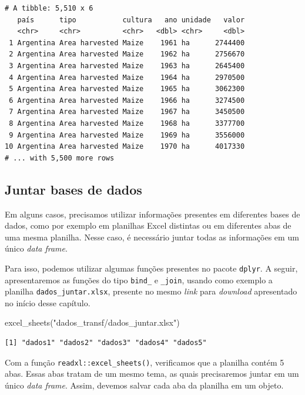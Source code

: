 \documentclass[
  brazilian,
]{book}
\newenvironment{Shaded}{\begin{snugshade}}{\end{snugshade}}
\newcommand{\FunctionTok}[1]{\textcolor[rgb]{0.00,0.00,0.00}{#1}}
\newcommand{\NormalTok}[1]{#1}
\newcommand{\StringTok}[1]{\textcolor[rgb]{0.31,0.60,0.02}{#1}}
\begin{document}
\begin{verbatim}
# A tibble: 5,510 x 6
   país      tipo           cultura   ano unidade   valor
   <chr>     <chr>          <chr>   <dbl> <chr>     <dbl>
 1 Argentina Area harvested Maize    1961 ha      2744400
 2 Argentina Area harvested Maize    1962 ha      2756670
 3 Argentina Area harvested Maize    1963 ha      2645400
 4 Argentina Area harvested Maize    1964 ha      2970500
 5 Argentina Area harvested Maize    1965 ha      3062300
 6 Argentina Area harvested Maize    1966 ha      3274500
 7 Argentina Area harvested Maize    1967 ha      3450500
 8 Argentina Area harvested Maize    1968 ha      3377700
 9 Argentina Area harvested Maize    1969 ha      3556000
10 Argentina Area harvested Maize    1970 ha      4017330
# ... with 5,500 more rows
\end{verbatim}

\hypertarget{juntar-bases-de-dados}{%
\subsection{Juntar bases de dados}\label{juntar-bases-de-dados}}

Em alguns casos, precisamos utilizar informações presentes em diferentes bases de dados, como por exemplo em planilhas Excel distintas ou em diferentes abas de uma mesma planilha. Nesse caso, é necessário juntar todas as informações em um único \emph{data frame}.

Para isso, podemos utilizar algumas funções presentes no pacote \texttt{dplyr}. A seguir, apresentaremos as funções do tipo \texttt{bind\_} e \texttt{\_join}, usando como exemplo a planilha \texttt{dados\_juntar.xlsx}, presente no mesmo \emph{link} para \emph{download} apresentado no início desse capítulo.

\begin{Shaded}
\begin{Highlighting}[]
\FunctionTok{excel\_sheets}\NormalTok{(}\StringTok{"dados\_transf/dados\_juntar.xlsx"}\NormalTok{)}
\end{Highlighting}
\end{Shaded}

\begin{verbatim}
[1] "dados1" "dados2" "dados3" "dados4" "dados5"
\end{verbatim}

Com a função \texttt{readxl::excel\_sheets()}, verificamos que a planilha contém 5 abas. Essas abas tratam de um mesmo tema, as quais precisaremos juntar em um único \emph{data frame}. Assim, devemos salvar cada aba da planilha em um objeto.
\end{document}

